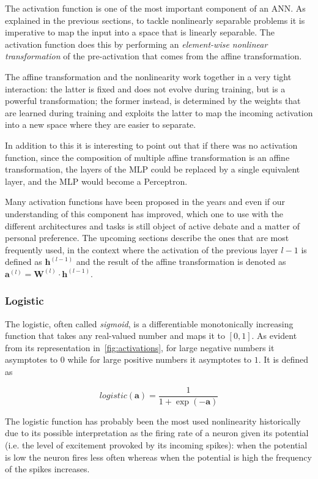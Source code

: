 The activation function is one of the most important component of an ANN. As
explained in the previous sections, to tackle nonlinearly separable problems it
is imperative to map the input into a space that is linearly separable. The
activation function does this by performing an \emph{element-wise nonlinear
transformation} of the pre-activation that comes from the affine
transformation.

The affine transformation and the nonlinearity work together in a very tight
interaction: the latter is fixed and does not evolve during training, but
is a powerful transformation; the former instead, is determined by the weights
that are learned during training and exploits the latter to map the incoming
activation into a new space where they are easier to separate.

In addition to this it is interesting to point out that if there was no
activation function, since the composition of multiple affine transformation
is an affine transformation, the layers of the MLP could be replaced by a
single equivalent layer, and the MLP would become a Perceptron.

Many activation functions have been proposed in the years and even if our
understanding of this component has improved, which one to use with the
different architectures and tasks is still object of active debate and a matter
of personal preference. The upcoming sections describe the ones that are most
frequently used, in the context where the activation of the previous layer
$l-1$ is defined as $\mathbf{h}^{(l-1)}$ and the result of the affine
transformation is denoted as $\mathbf{a}^{(l)} = \mathbf{W}^{(l)} \cdot
\mathbf{h}^{(l-1)}$.

\subsubsection{Logistic}\label{sec:logistic}
The logistic, often called \emph{sigmoid}, is a differentiable monotonically
increasing function that takes any real-valued number and maps it to $[0, 1]$.
As evident from its representation in~\autoref{fig:activations}, for large
negative numbers it asymptotes to $0$ while for large positive numbers it
asymptotes to $1$. It is defined as

\begin{equation}\label{eq:logistic}
    logistic(\mathbf{a}) = \frac{1}{1+\exp(-\mathbf{a})}
\end{equation}

\noindent The logistic function has probably been the most used nonlinearity
historically due to its possible interpretation as the firing rate of a neuron
given its potential (i.e. the level of excitement provoked by its incoming
spikes): when the potential is low the neuron fires less often whereas when the
potential is high the frequency of the spikes increases.

